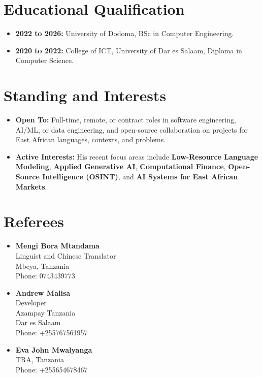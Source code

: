 \documentclass[12pt]{article}
\begin{document}
\section*{Educational Qualification}
\begin{itemize}
    \item \textbf{2022 to 2026:} University of Dodoma, BSc in Computer Engineering.
    \item \textbf{2020 to 2022:} College of ICT, University of Dar es Salaam, Diploma in Computer Science.
\end{itemize}

\section*{Standing and Interests}
\begin{itemize}
    \item \textbf{Open To:} Full-time, remote, or contract roles in software engineering, AI/ML, or data engineering, and open-source collaboration on projects for East African languages, contexts, and problems.
    \item \textbf{Active Interests:} His recent focus areas include \textbf{Low-Resource Language Modeling}, \textbf{Applied Generative AI}, \textbf{Computational Finance}, \textbf{Open-Source Intelligence (OSINT)}, and \textbf{AI Systems for East African Markets}.
\end{itemize}

\section*{Referees}
\begin{itemize}
    \item \textbf{Mengi Bora Mtandama} \\
    Linguist and Chinese Translator \\
    Mbeya, Tanzania \\
    Phone: 0743439773

    \item \textbf{Andrew Malisa} \\
    Developer \\
    Azampay Tanzania \\
    Dar es Salaam \\
    Phone: +255767561957

    \item \textbf{Eva John Mwalyanga} \\
    TRA, Tanzania \\
    Phone: +255654678467
\end{itemize}
\end{document}
